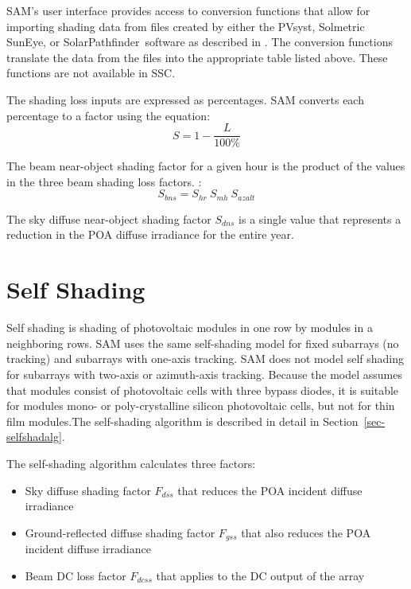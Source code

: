 \documentclass[12pt,letterpaper]{article}
\begin{document}
SAM's user interface provides access to conversion functions that allow for importing shading data from files created by either the PVsyst, Solmetric SunEye, or SolarPathfinder\texttrademark~software as described in \citet{help-shading}. The conversion functions translate the data from the files into the appropriate table listed above. These functions are not available in SSC.

The shading loss inputs are expressed as percentages. SAM converts each percentage to a factor using the equation:
\begin{equation}
S=1-\frac{L}{100\%}
\end{equation}

The beam near-object shading factor for a given hour is the product of the values in the three beam shading loss factors. :
\begin{equation}\label{eqn-sbns}
S_{bns}=S_{hr}~S_{mh}~S_{azalt}
\end{equation}

The sky diffuse near-object shading factor $S_{dns}$ is a single value that represents a reduction in the POA diffuse irradiance for the entire year.

\section{Self Shading}\label{sec-selfshad}

Self shading is shading of photovoltaic modules in one row by modules in a neighboring rows. SAM uses the same self-shading model for fixed subarrays (no tracking) and subarrays with one-axis tracking. SAM does not model self shading for subarrays with two-axis or azimuth-axis tracking. Because the model assumes that modules consist of photovoltaic cells with three bypass diodes, it is suitable for modules mono- or poly-crystalline silicon photovoltaic cells, but not for thin film modules.The self-shading algorithm is described in detail in Section~\ref{sec-selfshadalg}.

The self-shading algorithm calculates three factors:
\begin{itemize}
\item Sky diffuse shading factor $F_{dss}$ that reduces the POA incident diffuse irradiance
\item Ground-reflected diffuse shading factor $F_{gss}$ that also reduces the POA incident diffuse irradiance
\item Beam DC loss factor $F_{dcss}$ that applies to the DC output of the array
\end{itemize}
\end{document}
